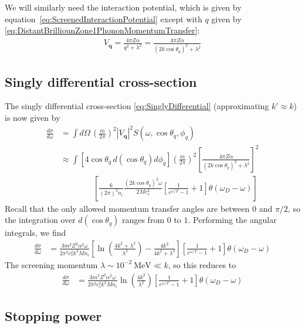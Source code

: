 \documentclass{article}
\newcommand{\MeV}{\text{MeV}}
\begin{document}
We will similarly need the interaction potential, which is given by equation~\eqref{eq:ScreenedInteractionPotential} except with $q$ given by \eqref{eq:DistantBrilliounZone1PhononMomentumTransfer}:
\begin{align}
V_\textbf{q} = \frac{4 \pi Z\alpha}{q^2 + \lambda^2} = \frac{4 \pi Z\alpha}{(2 k \cos\theta_q)^2+ \lambda^2}
\end{align}

\subsection{Singly differential cross-section}

The singly differential cross-section \eqref{eq:SinglyDifferential} (approximating $k' \approx k$) is now given by
\begin{align}
\frac{d \sigma}{d \omega} &= \int d \Omega\, \left( \frac{m}{2 \pi} \right)^2 |V_\textbf{q}|^2 S(\omega, \cos\theta_q, \phi_q) \\
   &\approx \int \left[ 4\cos\theta_q\, d(\cos\theta_q)d \phi_q \right] \left( \frac{m}{2 \pi} \right)^2 \left[ \frac{4 \pi Z\alpha}{(2 k \cos\theta_q)^2+ \lambda^2} \right]^2 \nonumber\\
   &\qquad\qquad \left[ \frac{6}{(2 \pi)^3 n_i} \frac{(2 k\cos\theta_q)^2\omega}{2 M c_s^2} \left[ \frac{1}{e^{\omega/T} - 1} + 1 \right] \theta(\omega_D - \omega) \right]
\end{align}
Recall that the only allowed momentum transfer angles are between 0 and $\pi/2$, so the integration over $d(\cos\theta_q)$ ranges from $0$ to $1$. Performing the angular integrals, we find
\begin{align}
\frac{d \sigma}{d \omega} &= \frac{3 m^2 Z^2 \alpha^2 \omega}{2\pi^2 c_s^2 k^2 M n_i} \left[ \ln \left( \frac{4 k^2 + \lambda^2}{\lambda^2} \right) - \frac{4k^2}{4 k^2 + \lambda^2} \right] \left[ \frac{1}{e^{\omega/T} - 1} + 1 \right] \theta(\omega_D - \omega)
\end{align}
The screening momentum $\lambda \sim 10^{-2}~\MeV \ll k$, so this reduces to
\begin{align}
\frac{d \sigma}{d \omega} &= \frac{3 m^2 Z^2 \alpha^2 \omega}{2\pi^2 c_s^2 k^2 M n_i} \ln \left( \frac{4 k^2}{\lambda^2} \right) \left[ \frac{1}{e^{\omega/T} - 1} + 1 \right] \theta(\omega_D - \omega)
\end{align}

\subsection{Stopping power}
\end{document}
